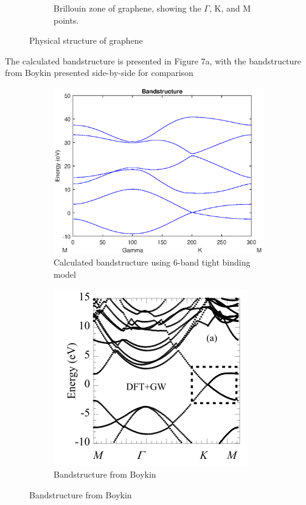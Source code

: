 \documentclass[11pt]{article}
\begin{document}
\begin{figure}[h!]
\begin{subfigure}[b]{0.3\textwidth}
        \caption{Brillouin zone of graphene, showing the $\Gamma$, K, and M points.}
        \label{fig:Idvd}
\end{subfigure}
\caption{Physical structure of graphene}\label{fig:animals}
\end{figure}

The calculated bandstructure is presented in Figure 7a, with the bandstructure from Boykin presented side-by-side for comparison

\begin{figure}[h!]
\centering
\begin{subfigure}[b]{0.3\textwidth}
    \includegraphics[width=\textwidth]{Bandstructure.eps}
\caption{Calculated bandstructure using 6-band tight binding model}
\end{subfigure}
\begin{subfigure}[b]{0.3\textwidth}
    \includegraphics[width=\textwidth]{paper1_bandstructure.png}
\caption{Bandstructure from Boykin}
\end{subfigure}
\end{figure}
\end{document}
